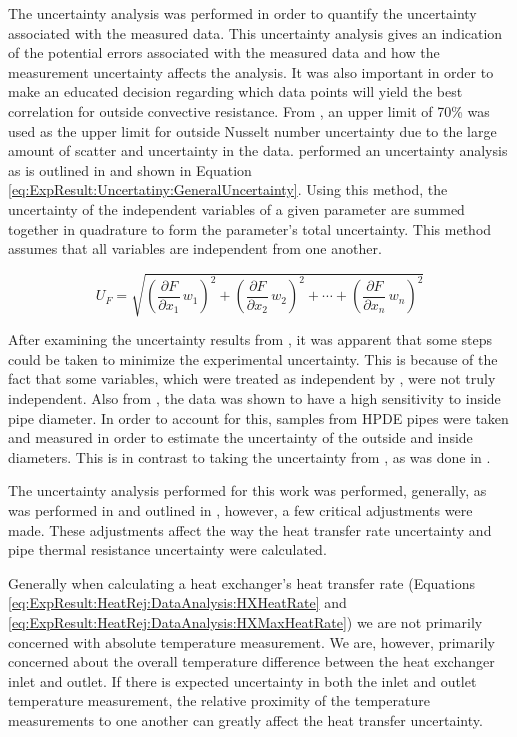 The uncertainty analysis was performed in order to quantify the uncertainty associated with the measured data. This uncertainty analysis gives an indication of the potential errors associated with the measured data and how the measurement uncertainty affects the analysis. It was also important in order to make an educated decision regarding which data points will yield the best correlation for outside convective resistance. From \cite{Hansen2011}, an upper limit of 70\% was used as the upper limit for outside Nusselt number uncertainty due to the large amount of scatter and uncertainty in the data. \cite{Hansen2011} performed an uncertainty analysis as is outlined in \cite{HolmanGajda1984} and shown in Equation \ref{eq:ExpResult:Uncertatiny:GeneralUncertainty}. Using this method, the uncertainty of the independent variables of a given parameter are summed together in quadrature to form the parameter's total uncertainty. This method assumes that all variables are independent from one another.

	\begin{equation}
		U_F = \sqrt{\left(\frac{\partial F}{\partial x_1} \, w_1 \right)^2 + \left(\frac{\partial F}{\partial x_2} \, w_2 \right)^2 + \cdots + \left(\frac{\partial F}{\partial x_n} \, w_n \right)^2}
		\label{eq:ExpResult:Uncertatiny:GeneralUncertainty}
	\end{equation}
	
After examining the uncertainty results from \cite{Hansen2011}, it was apparent that some steps could be taken to minimize the experimental uncertainty. This is because of the fact that some variables, which were treated as independent by \cite{Hansen2011}, were not truly independent. Also from \cite{Hansen2011}, the data was shown to have a high sensitivity to inside pipe diameter. In order to account for this, samples from HPDE pipes were taken and measured in order to estimate the uncertainty of the outside and inside diameters. This is in contrast to taking the uncertainty from \cite{ASTMD3035}, as was done in \cite{Hansen2011}.

The uncertainty analysis performed for this work was performed, generally, as was performed in \cite{Hansen2011} and outlined in \cite{HolmanGajda1984}, however, a few critical adjustments were made. These adjustments affect the way the heat transfer rate uncertainty and pipe thermal resistance uncertainty were calculated.

Generally when calculating a heat exchanger's heat transfer rate (Equations \ref{eq:ExpResult:HeatRej:DataAnalysis:HXHeatRate} and \ref{eq:ExpResult:HeatRej:DataAnalysis:HXMaxHeatRate}) we are not primarily concerned with absolute temperature measurement. We are, however, primarily concerned about the overall temperature difference between the heat exchanger inlet and outlet. If there is expected uncertainty in both the inlet and outlet temperature measurement, the relative proximity of the temperature measurements to one another can greatly affect the heat transfer uncertainty.

